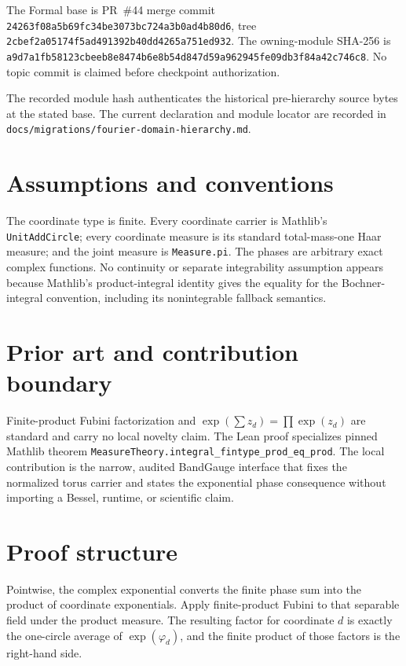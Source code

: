 \documentclass[10pt]{article}
\begin{document}
The Formal base is PR~\#44 merge commit
\texttt{24263f08a5b69fc34be3073bc724a3b0ad4b80d6}, tree
\texttt{2cbef2a05174f5ad491392b40dd4265a751ed932}. The owning-module SHA-256 is
\texttt{a9d7a1fb58123cbeeb8e8474b6e8b54d847d59a962945fe09db3f84a42c746c8}.
No topic commit is claimed before checkpoint authorization.

The recorded module hash authenticates the historical pre-hierarchy source bytes at the stated base. The current declaration and module locator are recorded in \texttt{docs/migrations/fourier-domain-hierarchy.md}.

\section{Assumptions and conventions}
The coordinate type is finite. Every coordinate carrier is Mathlib's \texttt{UnitAddCircle}; every
coordinate measure is its standard total-mass-one Haar measure; and the joint measure is
\texttt{Measure.pi}. The phases are arbitrary exact complex functions. No continuity or separate
integrability assumption appears because Mathlib's product-integral identity gives the equality
for the Bochner-integral convention, including its nonintegrable fallback semantics.

\section{Prior art and contribution boundary}
Finite-product Fubini factorization and $\exp(\sum z_d)=\prod\exp(z_d)$ are standard and carry no
local novelty claim. The Lean proof specializes pinned Mathlib theorem
\texttt{MeasureTheory.integral\_fintype\_prod\_eq\_prod}. The local contribution is the narrow,
audited BandGauge interface that fixes the normalized torus carrier and states the exponential
phase consequence without importing a Bessel, runtime, or scientific claim.

\section{Proof structure}
Pointwise, the complex exponential converts the finite phase sum into the product of coordinate
exponentials. Apply finite-product Fubini to that separable field under the product measure. The
resulting factor for coordinate $d$ is exactly the one-circle average of
$\exp(\varphi_d)$, and the finite product of those factors is the right-hand side.
\end{document}
